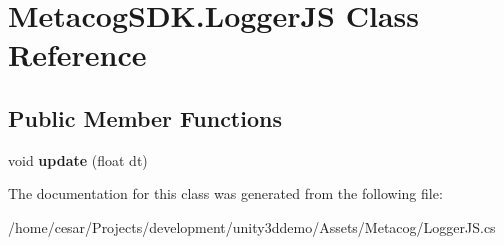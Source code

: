 \hypertarget{classMetacogSDK_1_1LoggerJS}{}\section{Metacog\+S\+D\+K.\+Logger\+JS Class Reference}
\label{classMetacogSDK_1_1LoggerJS}
\subsection*{Public Member Functions}
\begin{DoxyCompactItemize}
\item 
void {\bfseries update} (float dt)\hypertarget{classMetacogSDK_1_1LoggerJS_ab811435fde29df8941c7a8b82ecc13cb}{}\label{classMetacogSDK_1_1LoggerJS_ab811435fde29df8941c7a8b82ecc13cb}

\end{DoxyCompactItemize}


The documentation for this class was generated from the following file\+:\begin{DoxyCompactItemize}
\item 
/home/cesar/\+Projects/development/unity3ddemo/\+Assets/\+Metacog/Logger\+J\+S.\+cs\end{DoxyCompactItemize}
